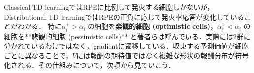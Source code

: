 Classical TD learningではRPEに比例して発火する細胞しかないが，Distributional TD learningではRPEの正負に応じて発火率応答が変化していることがわかる． 特に$\alpha_{i}^{+} \gt \alpha_{i}^{-}$の細胞を\textbf{楽観的細胞 (optimistic cells)}，$\alpha_{i}^{+}\lt
\alpha_{i}^{-}$の細胞を**悲観的細胞 (pessimistic
cells)** と著者らは呼んでいる．実際には2群に分かれているわけではなく，gradientに遷移している．収束する予測価値が細胞ごとに異なることで，$V$には報酬の期待値ではなく複雑な形状の報酬分布が符号化される．その仕組みについて，次項から見ていこう．
